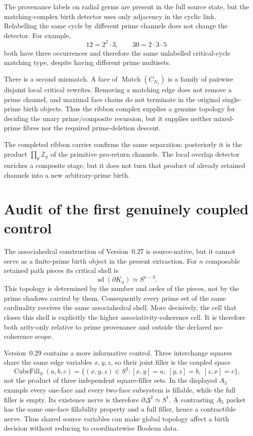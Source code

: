 \documentclass[11pt]{article}
\begin{document}
The provenance labels on radial germs are present in the full source state,
but the matching-complex birth detector uses only adjacency in the cyclic
link.  Relabelling the same cycle by different prime channels does not change
the detector.  For example,
\[
12=2^2\cdot3,
\qquad
30=2\cdot3\cdot5
\]
both have three occurrences and therefore the same unlabelled critical-cycle
matching type, despite having different prime multisets.

There is a second mismatch.  A face of
\(\operatorname{Match}(C_{N_s})\) is a family of pairwise disjoint local
critical rewrites.  Removing a matching edge does not remove a prime channel,
and maximal face chains do not terminate in the original single-prime birth
objects.  Thus the ribbon complex supplies a genuine topology for deciding the
unary prime/composite recursion, but it supplies neither mixed-prime fibres nor
the required prime-deletion descent.

The completed ribbon carrier confirms the same separation: posteriorly it is
the product \(\prod_p\mathbb Z_p\) of the primitive pro-return channels.
The local overlap detector enriches a composite stage, but it does not turn
that product of already retained channels into a new arbitrary-prime birth.

\section{Audit of the first genuinely coupled control}

The associahedral construction of Version~0.27 is source-native, but it cannot
serve as a finite-prime birth object in the present extraction.  For \(n\)
composable retained path pieces its critical shell is
\[
\operatorname{sd}(\partial K_n)\simeq S^{n-3}.
\]
This topology is determined by the number and order of the pieces, not by the
prime shadows carried by them.  Consequently every prime set of the same
cardinality receives the same associahedral shell.  More decisively, the cell
that closes this shell is explicitly the higher associativity-coherence cell.
It is therefore both arity-only relative to prime provenance and outside the
declared no-coherence scope.

Version~0.29 contains a more informative control.  Three interchange squares
share the same edge variables \(x,y,z\), so their joint filler is the coupled
space
\[
\operatorname{CubeFill}_{S}(a,b,c)
=
\{(x,y,z)\in S^3:[x,y]=a,\ [y,z]=b,\ [z,x]=c\},
\]
not the product of three independent square-filler sets.  In the displayed
\(A_5\) example every one-face and every two-face subsystem is fillable, while
the full filler is empty.  Its existence nerve is therefore
\(\partial\Delta^2\simeq S^1\).  A contrasting \(A_5\) packet has the same
one-face fillability property and a full filler, hence a contractible nerve.
Thus shared source variables can make global topology affect a birth decision
without reducing to coordinatewise Boolean data.
\end{document}
